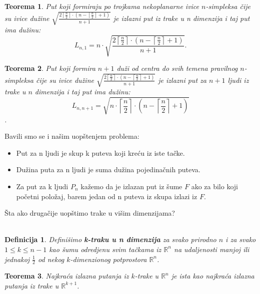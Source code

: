 \documentclass[b1paper,portrait]{template/baposter}
\newtheorem{theorem}{Teorema}
\newtheorem*{definition}{Definicija}
\begin{document}
\begin{poster}
{ 	\begin{theorem} Put koji formiraju po trojkama nekoplanarne ivice $n$-simpleksa \v cije su ivice du\v zine 
 		$\sqrt{\frac{2\left\lceil \frac{n}{2}\right\rceil\cdot \left( n-\left\lceil\frac{n}{2}\right\rceil+1\right)}{n+1}}$
 		je izlazni put iz trake u n dimenzija i taj put ima du\v zinu:
		$$L_{n,1}=n\cdot \sqrt{\frac{2\left\lceil \frac{n}{2}\right\rceil\cdot \left( n-\left\lceil\frac{n}{2}\right\rceil+1\right)}{n+1}}.$$
	\end{theorem}
	\begin{theorem}
 		Put koji formira $n+1$ du\v zi od centra do svih temena pravilnog $n$-simpleksa  \v cije su ivice du\v zine
 		$\sqrt{\frac{2\left\lceil \frac{n}{2}\right\rceil\cdot \left( n-\left\lceil\frac{n}{2}\right\rceil+1\right)}{n+1}}$
 		je izlazni put za $n+1$ ljudi iz trake u $n$ dimenzija i taj put ima du\v zinu:
		$$L_{n,n+1}=\sqrt{n\cdot\left\lceil\frac{n}{2}\right\rceil\cdot\left( n-\left\lceil\frac{n}{2}\right\rceil+1\right)}$$.
 	\end{theorem}
	 \vspace{0.15cm}
}


{
	Bavili smo se i na\v sim uop\v stenjem problema:
	\begin{itemize}
		\item Put za n ljudi je skup k puteva koji kre\' cu iz iste ta\v cke.
		\item Du\v zina puta za n ljudi je suma du\v zina pojedina\v cnih puteva.
		\item Za put za k ljudi $P_n$ ka\v zemo da je izlazan put iz \v sume $F$ ako za bilo koji po\v cetni polo\v zaj, barem jedan od n puteva iz skupa izlazi iz $F$.
	\end{itemize}
	\vspace{0.15cm}
}


{
	\v Sta ako druga\v cije uop\v stimo trake u vi\v sim dimenzijama? \\ \\
	\begin{definition}
		Defini\v simo \textbf{k-traku u n dimenzija} za svako prirodno $n$ i za svako $1\leqslant k\leqslant n-1$  kao \v sumu odredjenu
		svim ta\v ckama iz $\mathbb{R}^n$ na udaljenosti manjoj ili jednakoj $\frac{1}{2}$ od nekog $k$-dimenzionog potprostora $\mathbb{R}^n$. 
	\end{definition}
	\begin{theorem}
		Najkra\' ca izlazna putanja iz $k$-trake u $\mathbb{R}^n$ je ista kao najkra\' ca izlazna putanja iz trake u $\mathbb{R}^{k+1}$.
	\end{theorem}
	\vspace{0.15cm}
}



\end{poster}
\end{document}
